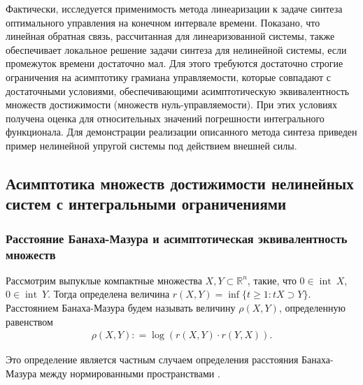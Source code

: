 \documentclass[../main.tex]{subfiles}
\begin{document}
Фактически, исследуется применимость метода линеаризации к задаче синтеза оптимального управления на конечном интервале времени. 
Показано, что линейная обратная связь, рассчитанная для линеаризованной системы, также обеспечивает локальное решение задачи синтеза для нелинейной системы, если промежуток времени достаточно мал. 
Для этого требуются достаточно строгие ограничения на асимптотику грамиана управляемости, которые совпадают с достаточными условиями, обеспечивающими асимптотическую эквивалентность множеств достижимости (множеств нуль-управляемости). 
При этих условиях получена оценка для относительных значений погрешности интегрального функционала. 
Для демонстрации реализации описанного метода синтеза приведен пример нелинейной упругой системы под действием внешней силы. 


\subsection{Асимптотика множеств достижимости нелинейных систем с интегральными ограничениями} 


\subsubsection{Расстояние Банаха-Мазура и асимптотическая эквивалентность множеств}\label{sec21:AsymptoticEquality}

Рассмотрим выпуклые компактные множества $ X,Y \subset \mathbb R^n $, такие, что $0 \in \operatorname{int}\ X$, $0 \in \operatorname{int}\ Y$. 
Тогда определена величина $r(X, Y) = \inf \{t \geq 1: tX \supset Y \}$. 
Расстоянием Банаха-Мазура будем называть величину $ \rho (X, Y) $, определенную равенством 
\begin{gather*}
 \rho (X, Y): = \log (r(X,Y) \cdot r(Y, X)).
\end{gather*}

Это определение является частным случаем определения расстояния Банаха-Мазура между нормированными пространствами \cite[Определение 2.4.6]{Thompson}.
\end{document}
